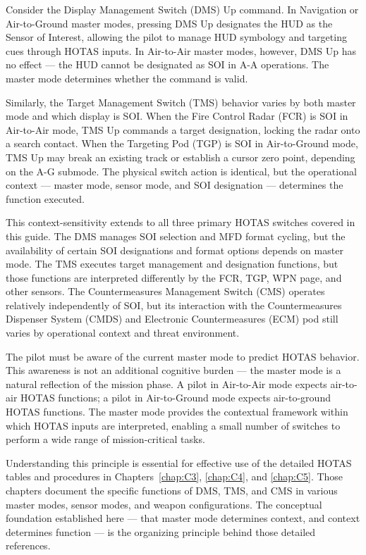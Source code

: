 \documentclass[11pt, a4paper, twoside]{report}
\begin{document}
Consider the Display Management Switch (DMS) Up command. In Navigation or Air-to-Ground master modes, pressing DMS Up designates the HUD as the Sensor of Interest, allowing the pilot to manage HUD symbology and targeting cues through HOTAS inputs. In Air-to-Air master modes, however, DMS Up has no effect — the HUD cannot be designated as SOI in A-A operations. The master mode determines whether the command is valid.

Similarly, the Target Management Switch (TMS) behavior varies by both master mode and which display is SOI. When the Fire Control Radar (FCR) is SOI in Air-to-Air mode, TMS Up commands a target designation, locking the radar onto a search contact. When the Targeting Pod (TGP) is SOI in Air-to-Ground mode, TMS Up may break an existing track or establish a cursor zero point, depending on the A-G submode. The physical switch action is identical, but the operational context — master mode, sensor mode, and SOI designation — determines the function executed.

This context-sensitivity extends to all three primary HOTAS switches covered in this guide. The DMS manages SOI selection and MFD format cycling, but the availability of certain SOI designations and format options depends on master mode. The TMS executes target management and designation functions, but those functions are interpreted differently by the FCR, TGP, WPN page, and other sensors. The Countermeasures Management Switch (CMS) operates relatively independently of SOI, but its interaction with the Countermeasures Dispenser System (CMDS) and Electronic Countermeasures (ECM) pod still varies by operational context and threat environment.

The pilot must be aware of the current master mode to predict HOTAS behavior. This awareness is not an additional cognitive burden — the master mode is a natural reflection of the mission phase. A pilot in Air-to-Air mode expects air-to-air HOTAS functions; a pilot in Air-to-Ground mode expects air-to-ground HOTAS functions. The master mode provides the contextual framework within which HOTAS inputs are interpreted, enabling a small number of switches to perform a wide range of mission-critical tasks.

Understanding this principle is essential for effective use of the detailed HOTAS tables and procedures in Chapters~\ref{chap:C3}, \ref{chap:C4}, and \ref{chap:C5}. Those chapters document the specific functions of DMS, TMS, and CMS in various master modes, sensor modes, and weapon configurations. The conceptual foundation established here — that master mode determines context, and context determines function — is the organizing principle behind those detailed references.
\end{document}
